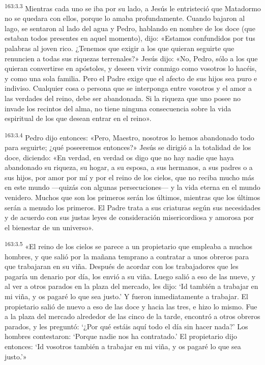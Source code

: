\par 
\textsuperscript{163:3.3} Mientras cada uno se iba por su lado, a Jesús le entristeció que Matadormo no se quedara con ellos, porque lo amaba profundamente. Cuando bajaron al lago, se sentaron al lado del agua y Pedro, hablando en nombre de los doce (que estaban todos presentes en aquel momento), dijo: «Estamos confundidos por tus palabras al joven rico. ¿Tenemos que exigir a los que quieran seguirte que renuncien a todas sus riquezas terrenales?» Jesús dijo: «No, Pedro, sólo a los que quieran convertirse en apóstoles, y deseen vivir conmigo como vosotros lo hacéis, y como una sola familia. Pero el Padre exige que el afecto de sus hijos sea puro e indiviso. Cualquier cosa o persona que se interponga entre vosotros y el amor a las verdades del reino, debe ser abandonada. Si la riqueza que uno posee no invade los recintos del alma, no tiene ninguna consecuencia sobre la vida espiritual de los que desean entrar en el reino».

\par 
\textsuperscript{163:3.4} Pedro dijo entonces: «Pero, Maestro, nosotros lo hemos abandonado todo para seguirte; ¿qué poseeremos entonces?» Jesús se dirigió a la totalidad de los doce, diciendo: «En verdad, en verdad os digo que no hay nadie que haya abandonado su riqueza, su hogar, a su esposa, a sus hermanos, a sus padres o a sus hijos, por amor por mí y por el reino de los cielos, que no reciba mucho más en este mundo ---quizás con algunas persecuciones--- y la vida eterna en el mundo venidero. Muchos que son los primeros serán los últimos, mientras que los últimos serán a menudo los primeros. El Padre trata a sus criaturas según sus necesidades y de acuerdo con sus justas leyes de consideración misericordiosa y amorosa por el bienestar de un universo».

\par 
\textsuperscript{163:3.5} «El reino de los cielos se parece a un propietario que empleaba a muchos hombres, y que salió por la mañana temprano a contratar a unos obreros para que trabajaran en su viña. Después de acordar con los trabajadores que les pagaría un denario por día, los envió a su viña. Luego salió a eso de las nueve, y al ver a otros parados en la plaza del mercado, les dijo: `Id también a trabajar en mi viña, y os pagaré lo que sea justo.' Y fueron inmediatamente a trabajar. El propietario salió de nuevo a eso de las doce y hacia las tres, e hizo lo mismo. Fue a la plaza del mercado alrededor de las cinco de la tarde, encontró a otros obreros parados, y les preguntó: `¿Por qué estáis aquí todo el día sin hacer nada?' Los hombres contestaron: `Porque nadie nos ha contratado.' El propietario dijo entonces: `Id vosotros también a trabajar en mi viña, y os pagaré lo que sea justo.'»

